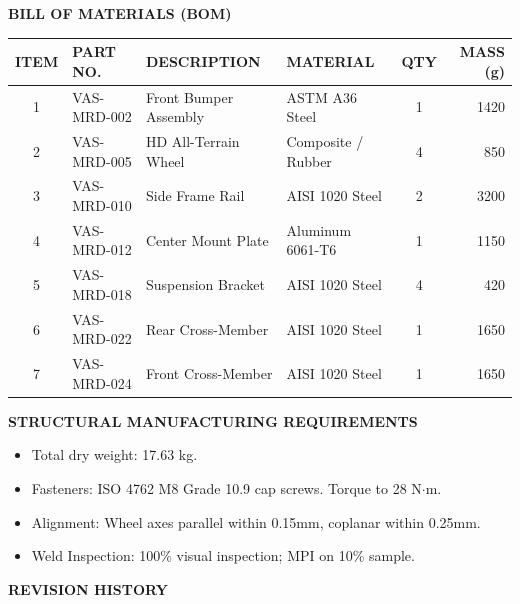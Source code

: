 \documentclass[10pt]{article}
\newcommand{\dwgtitle}{CHASSIS ASSEMBLY \& WELDMENT}
\newcommand{\dwgno}{VAS-MRD-001}
\newcommand{\dwgrev}{C}
\newcommand{\dwgscale}{1:5}
\begin{document}
\hfill
\begin{minipage}[t]{14.0cm}
  \vspace{0.8cm}
  {\fontsize{10}{12}\selectfont\sffamily\bfseries\color{CADBlue} BILL OF MATERIALS (BOM)}\\[3mm]
  \renewcommand{\arraystretch}{1.2}
  \begin{tabularx}{\textwidth}{c l X l c r}
    \toprule
    \rowcolor{CADBlue!5}
    \textbf{ITEM} & \textbf{PART NO.} & \textbf{DESCRIPTION} & \textbf{MATERIAL} & \textbf{QTY} & \textbf{MASS (g)} \\
    \midrule
    1 & VAS-MRD-002 & Front Bumper Assembly & ASTM A36 Steel & 1 & 1420 \\
    2 & VAS-MRD-005 & HD All-Terrain Wheel & Composite / Rubber & 4 & 850 \\
    3 & VAS-MRD-010 & Side Frame Rail & AISI 1020 Steel & 2 & 3200 \\
    4 & VAS-MRD-012 & Center Mount Plate & Aluminum 6061-T6 & 1 & 1150 \\
    5 & VAS-MRD-018 & Suspension Bracket & AISI 1020 Steel & 4 & 420 \\
    6 & VAS-MRD-022 & Rear Cross-Member & AISI 1020 Steel & 1 & 1650 \\
    7 & VAS-MRD-024 & Front Cross-Member & AISI 1020 Steel & 1 & 1650 \\
    \bottomrule
  \end{tabularx}
  \par\vspace{5mm}
  {\fontsize{8.5}{10.5}\selectfont\sffamily\bfseries\color{CADBlue} STRUCTURAL MANUFACTURING REQUIREMENTS}
  
  \vspace{1.5mm}
  {\fontsize{7.5}{9.5}\selectfont\sffamily
  \begin{itemize}[noitemsep, topsep=0pt, parsep=0pt, partopsep=0pt, leftmargin=12pt]
    \setlength{\itemsep}{3pt}
    \item Total dry weight: 17.63 kg.
    \item Fasteners: ISO 4762 M8 Grade 10.9 cap screws. Torque to 28 N$\cdot$m.
    \item Alignment: Wheel axes parallel within 0.15mm, coplanar within 0.25mm.
    \item Weld Inspection: 100\% visual inspection; MPI on 10\% sample.
  \end{itemize}
  }
\end{minipage}

\clearpage
\gdef\dwgtitle{REVISIONS \& TECHNICAL SPECS}%
\gdef\dwgno{VAS-MRD-003}%
\gdef\dwgrev{A}%
\gdef\dwgscale{NTS}%
\noindent
{\fontsize{10}{12}\selectfont\sffamily\bfseries\color{CADBlue} REVISION HISTORY}
\end{document}
